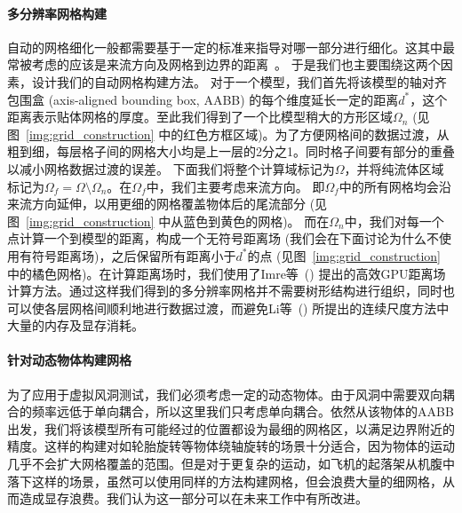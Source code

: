 \paragraph{多分辨率网格构建}
自动的网格细化一般都需要基于一定的标准来指导对哪一部分进行细化。这其中最常被考虑的应该是来流方向及网格到边界的距离~\cite{Sandoval-2012,Li-2019}。
于是我们也主要围绕这两个因素，设计我们的自动网格构建方法。
对于一个模型，我们首先将该模型的轴对齐包围盒 (axis-aligned bounding box, AABB) 的每个维度延长一定的距离$d^*$，这个距离表示贴体网格的厚度。至此我们得到了一个比模型稍大的方形区域$\Omega_n$ (见图~\ref{img:grid_construction} 中的红色方框区域)。为了方便网格间的数据过渡，从粗到细，每层格子间的网格大小均是上一层的2分之1。同时格子间要有部分的重叠以减小网格数据过渡的误差。
下面我们将整个计算域标记为$\Omega$，并将纯流体区域标记为$\Omega_f \!=\! \Omega \setminus \Omega_n$。在$\Omega_f$中，我们主要考虑来流方向。
即$\Omega_f$中的所有网格均会沿来流方向延伸，以用更细的网格覆盖物体后的尾流部分 (见图~\ref{img:grid_construction} 中从蓝色到黄色的网格)。
而在$\Omega_n$中，我们对每一个点计算一个到模型的距离，构成一个无符号距离场 (我们会在下面讨论为什么不使用有符号距离场)，之后保留所有距离小于$d^*$的点 (见图~\ref{img:grid_construction} 中的橘色网格)。在计算距离场时，我们使用了Imre等~(\citeyear{Imre-2017}) 提出的高效GPU距离场计算方法。通过这样我们得到的多分辨率网格并不需要树形结构进行组织，同时也可以使各层网格间顺利地进行数据过渡，而避免Li等~(\citeyear{Li-2019}) 所提出的连续尺度方法中大量的内存及显存消耗。

\paragraph{针对动态物体构建网格}
为了应用于虚拟风洞测试，我们必须考虑一定的动态物体。由于风洞中需要双向耦合的频率远低于单向耦合，所以这里我们只考虑单向耦合。依然从该物体的AABB出发，我们将该模型所有可能经过的位置都设为最细的网格区，以满足边界附近的精度。这样的构建对如轮胎旋转等物体绕轴旋转的场景十分适合，因为物体的运动几乎不会扩大网格覆盖的范围。但是对于更复杂的运动，如飞机的起落架从机腹中落下这样的场景，虽然可以使用同样的方法构建网格，但会浪费大量的细网格，从而造成显存浪费。我们认为这一部分可以在未来工作中有所改进。


